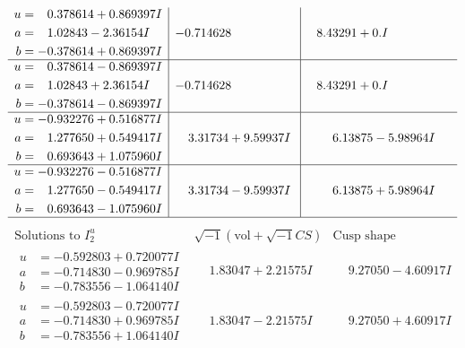 \documentclass[1p]{elsarticle_modified}
\theoremstyle{definition}
\newcommand{\I}{\sqrt{-1}}
\begin{document}
$$\begin{array}{c|c|c}
\begin{aligned}
u &= \phantom{-}0.378614 + 0.869397 I \\
a &= \phantom{-}1.02843 - 2.36154 I \\
b &= -0.378614 + 0.869397 I\end{aligned}
 & -0.714628\phantom{ +0.000000I} & \phantom{-}8.43291 + 0. I\phantom{ +0.000000I} \\ \hline\begin{aligned}
u &= \phantom{-}0.378614 - 0.869397 I \\
a &= \phantom{-}1.02843 + 2.36154 I \\
b &= -0.378614 - 0.869397 I\end{aligned}
 & -0.714628\phantom{ +0.000000I} & \phantom{-}8.43291 + 0. I\phantom{ +0.000000I} \\ \hline\begin{aligned}
u &= -0.932276 + 0.516877 I \\
a &= \phantom{-}1.277650 + 0.549417 I \\
b &= \phantom{-}0.693643 + 1.075960 I\end{aligned}
 & \phantom{-}3.31734 + 9.59937 I & \phantom{-}6.13875 - 5.98964 I \\ \hline\begin{aligned}
u &= -0.932276 - 0.516877 I \\
a &= \phantom{-}1.277650 - 0.549417 I \\
b &= \phantom{-}0.693643 - 1.075960 I\end{aligned}
 & \phantom{-}3.31734 - 9.59937 I & \phantom{-}6.13875 + 5.98964 I\\
 \hline 
 \end{array}$$\newpage$$\begin{array}{c|c|c}  
\text{Solutions to }I^u_{2}& \I (\text{vol} + \sqrt{-1}CS) & \text{Cusp shape}\\
 \hline 
\begin{aligned}
u &= -0.592803 + 0.720077 I \\
a &= -0.714830 - 0.969785 I \\
b &= -0.783556 - 1.064140 I\end{aligned}
 & \phantom{-}1.83047 + 2.21575 I & \phantom{-}9.27050 - 4.60917 I \\ \hline\begin{aligned}
u &= -0.592803 - 0.720077 I \\
a &= -0.714830 + 0.969785 I \\
b &= -0.783556 + 1.064140 I\end{aligned}
 & \phantom{-}1.83047 - 2.21575 I & \phantom{-}9.27050 + 4.60917 I \\ \hline\begin{aligned}

\end{aligned}
\end{array}$$
\end{document}
